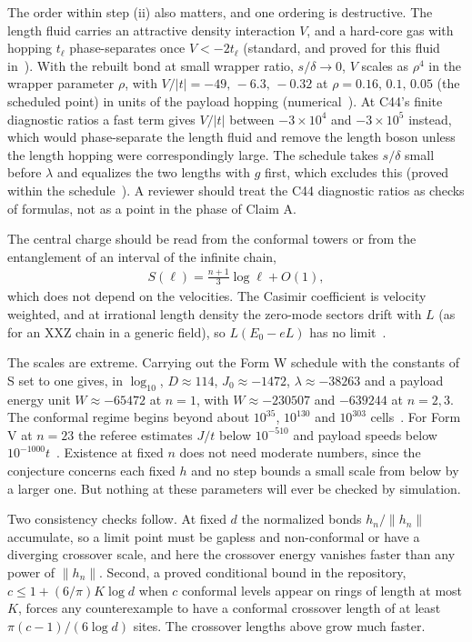 \documentclass[11pt]{article}
\theoremstyle{definition}
\begin{document}
The order within step (ii) also matters, and one ordering is destructive. The length fluid carries an attractive density interaction $V$, and a hard-core gas with hopping $t_\ell$ phase-separates once $V<-2t_\ell$ (standard, and proved for this fluid in~\cite{C54}). With the rebuilt bond at small wrapper ratio, $s/\delta\to0$, $V$ scales as $\rho^4$ in the wrapper parameter $\rho$, with $V/|t|=-49,\,-6.3,\,-0.32$ at $\rho=0.16,\,0.1,\,0.05$ (the scheduled point) in units of the payload hopping (numerical~\cite{verC44}). At C44's finite diagnostic ratios a fast term gives $V/|t|$ between $-3\times10^{4}$ and $-3\times10^{5}$ instead, which would phase-separate the length fluid and remove the length boson unless the length hopping were correspondingly large. The schedule takes $s/\delta$ small before $\lambda$ and equalizes the two lengths with $g$ first, which excludes this (proved within the schedule~\cite{C54}). A reviewer should treat the C44 diagnostic ratios as checks of formulas, not as a point in the phase of Claim A.

The central charge should be read from the conformal towers or from the entanglement of an interval of the infinite chain,
\begin{align}
S(\ell)=\frac{n+1}{3}\log\ell+O(1),
\label{eq:Sl}
\end{align}
which does not depend on the velocities. The Casimir coefficient is velocity weighted, and at irrational length density the zero-mode sectors drift with $L$ (as for an XXZ chain in a generic field), so $L(E_0-eL)$ has no limit~\cite{refC44}.

The scales are extreme. Carrying out the Form W schedule with the constants of S set to one gives, in $\log_{10}$, $D\approx114$, $J_0\approx-1472$, $\lambda\approx-38263$ and a payload energy unit $W\approx-65472$ at $n=1$, with $W\approx-230507$ and $-639244$ at $n=2,3$. The conformal regime begins beyond about $10^{35}$, $10^{130}$ and $10^{303}$ cells~\cite{refC44}. For Form V at $n=23$ the referee estimates $J/t$ below $10^{-510}$ and payload speeds below $10^{-1000}t$~\cite{refd24}. Existence at fixed $n$ does not need moderate numbers, since the conjecture concerns each fixed $h$ and no step bounds a small scale from below by a larger one. But nothing at these parameters will ever be checked by simulation.

Two consistency checks follow. At fixed $d$ the normalized bonds $h_n/\|h_n\|$ accumulate, so a limit point must be gapless and non-conformal or have a diverging crossover scale, and here the crossover energy vanishes faster than any power of $\|h_n\|$. Second, a proved conditional bound in the repository, $c\le1+(6/\pi)K\log d$ when $c$ conformal levels appear on rings of length at most $K$, forces any counterexample to have a conformal crossover length of at least $\pi(c-1)/(6\log d)$ sites. The crossover lengths above grow much faster.
\end{document}
